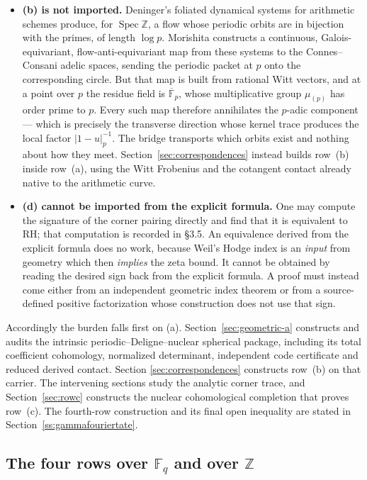 \documentclass[11pt]{amsart}
\theoremstyle{definition}
\theoremstyle{remark}
\newcommand{\Z}{\mathbb Z}
\newcommand{\RH}{\mathrm{RH}}
\newcommand{\Spec}{\operatorname{Spec}}
\begin{document}
\begin{itemize}
\item \textbf{(b) is not imported.}  Deninger's foliated
dynamical systems for arithmetic schemes \cite{Deninger2024} produce, for
$\Spec\Z$, a flow whose periodic orbits are in bijection with the primes,
of length $\log p$.  Morishita \cite{Morishita2026} constructs a continuous,
Galois-equivariant, flow-anti-equivariant map from these systems to the
Connes--Consani adelic spaces, sending the periodic packet at $p$ onto the
corresponding circle.  But that map is built from rational Witt vectors, and
at a point over $p$ the residue field is $\overline{\mathbb F}_p$, whose
multiplicative group $\mu_{(p)}$ has order prime to $p$.  Every such map
therefore annihilates the $p$-adic component --- which is precisely the
transverse direction whose kernel trace produces the local factor
$|1-u|_p^{-1}$.  The bridge transports which orbits exist and nothing about
how they meet.  Section~\ref{sec:correspondences} instead builds row~(b)
inside row~(a), using the Witt Frobenius and the cotangent contact already
native to the arithmetic curve.

\item \textbf{(d) cannot be imported from the explicit formula.}  One may
compute the signature of the corner pairing directly and find that it is
equivalent to $\RH$; that computation is recorded in \S3.5.  An equivalence
derived from the explicit formula does no work, because Weil's Hodge index
is an \emph{input} from geometry which then \emph{implies} the zeta bound.
It cannot be obtained by reading the desired sign back from the explicit
formula.  A proof must instead come either from an independent geometric
index theorem or from a source-defined positive factorization whose
construction does not use that sign.
\end{itemize}

Accordingly the burden falls first on (a).  Section~\ref{sec:geometric-a}
constructs and audits the intrinsic periodic--Deligne--nuclear spherical
package, including its total coefficient cohomology, normalized determinant,
independent code certificate and reduced derived contact.
Section
\ref{sec:correspondences} constructs row~(b) on that carrier.  The
intervening sections study the analytic corner trace, and
Section~\ref{sec:rowc} constructs the nuclear cohomological completion that
proves row~(c).  The fourth-row construction and its final open inequality are stated in
Section~\ref{ss:gammafouriertate}.

\subsection{The four rows over $\mathbb F_q$ and over $\Z$}
\label{ss:map}
\end{document}
